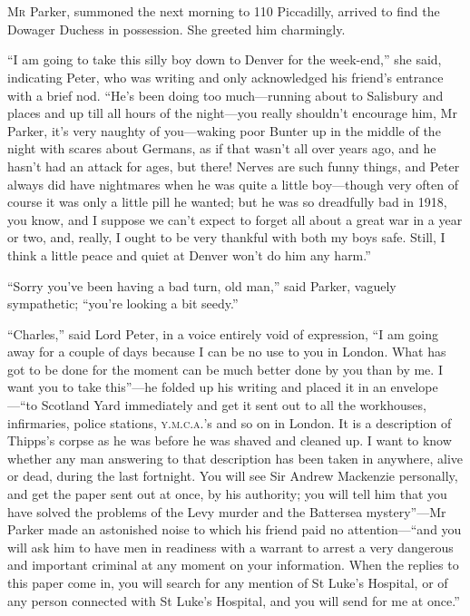 \chapter[Chapter \thechapter]{}
\lettrine[lines=4]{M}{r} Parker, summoned the next morning to 110 Piccadilly, arrived to find the Dowager Duchess in possession. She greeted him charmingly.

\enquote{I am going to take this silly boy down to Denver for the week-end,} she said, indicating Peter, who was writing and only acknowledged his friend’s entrance with a brief nod. \enquote{He’s been doing too much\allowbreak---\allowbreak running about to Salisbury and places and up till all hours of the night\allowbreak---\allowbreak you really shouldn’t encourage him, Mr Parker, it’s very naughty of you\allowbreak---\allowbreak waking poor Bunter up in the middle of the night with scares about Germans, as if that wasn’t all over years ago, and he hasn’t had an attack for ages, but there! Nerves are such funny things, and Peter always did have nightmares when he was quite a little boy\allowbreak---\allowbreak though very often of course it was only a little pill he wanted; but he was so dreadfully bad in 1918, you know, and I suppose we can’t expect to forget all about a great war in a year or two, and, really, I ought to be very thankful with both my boys safe. Still, I think a little peace and quiet at Denver won’t do him any harm.}

\enquote{Sorry you’ve been having a bad turn, old man,} said Parker, vaguely sympathetic; \enquote{you’re looking a bit seedy.}

\enquote{Charles,} said Lord Peter, in a voice entirely void of expression, \enquote{I am going away for a couple of days because I can be no use to you in London. What has got to be done for the moment can be much better done by you than by me. I want you to take this}---he folded up his writing and placed it in an envelope---\enquote{to Scotland Yard immediately and get it sent out to all the workhouses, infirmaries, police stations, \textsc{y.m.c.a.}’s and so on in London. It is a description of Thipps’s corpse as he was before he was shaved and cleaned up. I want to know whether any man answering to that description has been taken in anywhere, alive or dead, during the last fortnight. You will see Sir Andrew Mackenzie personally, and get the paper sent out at once, by his authority; you will tell him that you have solved the problems of the Levy murder and the Battersea mystery}---Mr Parker made an astonished noise to which his friend paid no attention---\enquote{and you will ask him to have men in readiness with a warrant to arrest a very dangerous and important criminal at any moment on your information. When the replies to this paper come in, you will search for any mention of St Luke’s Hospital, or of any person connected with St Luke’s Hospital, and you will send for me at once.}

